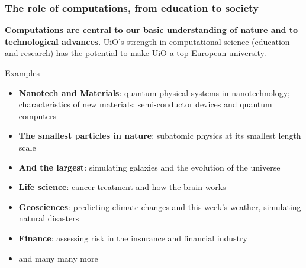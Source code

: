 \documentclass{beamer}
\begin{document}
\begin{frame}
\frametitle{The role of computations, from education to society}

\begin{block}{}
\textbf{Computations are central to our 
basic understanding of nature and to technological advances}.
UiO's strength in computational science (education and research)
has the potential to make UiO a top European university.
\end{block}

\begin{block}{Examples }
\begin{itemize}
\item \textbf{Nanotech and Materials}: quantum physical systems in nanotechnology; characteristics of new materials; semi-conductor devices and quantum computers

\item \textbf{The smallest particles in nature}: subatomic physics at its smallest length scale

\item \textbf{And the largest}: simulating galaxies and the evolution of the universe

\item \textbf{Life science}: cancer treatment and how the brain works

\item \textbf{Geosciences}: predicting climate changes and this week's weather, simulating natural disasters

\item \textbf{Finance}: assessing risk in the insurance and financial industry

\item and many many more
\end{itemize}

\noindent
\end{block}
\end{frame}
\end{document}
